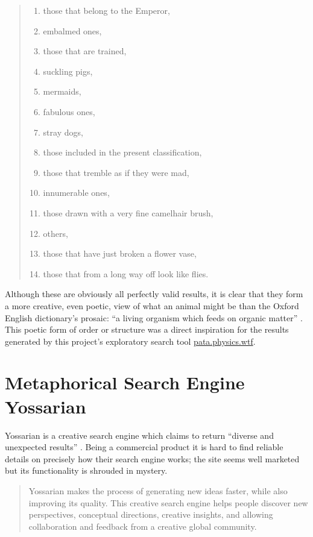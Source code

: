 \begin{quotation}
\begin{enumerate}
  \item those that belong to the Emperor,
  \item embalmed ones,
  \item those that are trained,
  \item suckling pigs,
  \item mermaids,
  \item fabulous ones,
  \item stray dogs,
  \item those included in the present classification,
  \item those that tremble as if they were mad,
  \item innumerable ones,
  \item those drawn with a very fine camelhair brush,
  \item others,
  \item those that have just broken a flower vase,
  \item those that from a long way off look like flies.
\end{enumerate}
\end{quotation}

Although these are obviously all perfectly valid results, it is clear that they form a more creative, even poetic, view of what an animal might be than the Oxford English dictionary's prosaic: ``a living organism which feeds on organic matter'' \autocite*{OEDanimal}. This poetic form of order or structure was a direct inspiration for the results generated by this project's exploratory search tool \url{pata.physics.wtf}.


\section{Metaphorical Search Engine Yossarian}
\label{s:yossarian}

Yossarian is a creative search engine which claims to return ``diverse and unexpected results'' \autocite*{Yossarian2015}. Being a commercial product it is hard to find reliable details on precisely how their search engine works; the site seems well marketed but its functionality is shrouded in mystery.

\begin{quotation}
  Yossarian makes the process of generating new ideas faster, while also improving its quality. This creative search engine helps people discover new perspectives, conceptual directions, creative insights, and allowing collaboration and feedback from a creative global community. 
\end{quotation}

